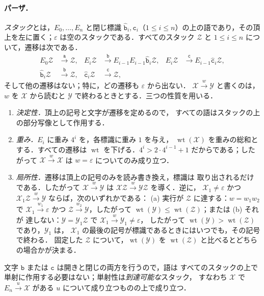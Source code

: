 \documentclass[11pt,a4paper]{ltjsarticle}
\numberwithin{equation}{section}
\theoremstyle{plain}
\theoremstyle{definition}
\theoremstyle{remark}
\newcommand{\eps}{\varepsilon}
\theoremstyle{plain}
\begin{document}
\paragraph{パーザ．}
\emph{スタック}とは，$E_0,\ldots,E_n$ と閉じ標識
$\hat{\mathtt b}_i,\hat{\mathtt c}_i$（$1\le i\le n$）の上の語であり，その頂上を左に置く；$\eps$
は空のスタックである．すべてのスタック $\mathcal Z$ と $1\le i\le n$ について，遷移は次である．
\[
\begin{aligned}
E_0\mathcal Z&\xrightarrow{\mathtt a}\mathcal Z,&
E_i\mathcal Z&\xrightarrow{\mathtt b}E_{i-1}E_{i-1}\hat{\mathtt b}_i\mathcal Z,&
E_i\mathcal Z&\xrightarrow{\mathtt c}E_{i-1}\hat{\mathtt c}_i\mathcal Z,\\
\hat{\mathtt b}_i\mathcal Z&\xrightarrow{\mathtt b}\mathcal Z,&
\hat{\mathtt c}_i\mathcal Z&\xrightarrow{\mathtt c}\mathcal Z,
\end{aligned}
\]
そして他の遷移はない；特に，どの遷移も $\eps$ から出ない．
$\mathcal X\xrightarrow{w}\mathcal Y$ と書くのは，$w$ を $\mathcal X$ から読むと
$\mathcal Y$ で終わるときとする．三つの性質を用いる．
\begin{enumerate}[label=\textup{(D\arabic*)},leftmargin=2.6em]
\item \emph{決定性．}頂上の記号と文字が遷移を定めるので，
すべての語はスタックの上の部分写像として作用する．
\item \emph{重み．}$E_i$ に重み $4^i$ を，各標識に重み $1$ を与え，
$\operatorname{wt}(\mathcal X)$ を重みの総和とする．すべての遷移は
$\operatorname{wt}$ を下げる．$4^i>2\cdot4^{i-1}+1$ だからである；したがって
$\mathcal X\xrightarrow{w}\mathcal X$ は $w=\eps$ についてのみ成り立つ．
\item \emph{局所性．}遷移は頂上の記号のみを読み書き換え，標識は
取り出されるだけである．したがって $\mathcal X\xrightarrow{w}\mathcal Y$ は
$\mathcal X\mathcal Z\xrightarrow{w}\mathcal Y\mathcal Z$ を導く．逆に，
$\mathcal X_1\ne\eps$ かつ $\mathcal X_1\mathcal Z\xrightarrow{w}\mathcal Y$ ならば，次のいずれかである：
\textup{(a)} 実行が $\mathcal Z$ に達する：$w=w_1w_2$ で
$\mathcal X_1\xrightarrow{w_1}\eps$ かつ $\mathcal Z\xrightarrow{w_2}\mathcal Y$，したがって
$\operatorname{wt}(\mathcal Y)\le\operatorname{wt}(\mathcal Z)$；または \textup{(b)} それが
達しない：$\mathcal Y=\mathcal Y_1\mathcal Z$ で $\mathcal X_1\xrightarrow{w}\mathcal Y_1\ne\eps$，
したがって $\operatorname{wt}(\mathcal Y)>\operatorname{wt}(\mathcal Z)$ であり，$\mathcal Y_1$ は，
$\mathcal X_1$ の最後の記号が標識であるときにはいつでも，その記号で終わる．
固定した $\mathcal Z$ について，$\operatorname{wt}(\mathcal Y)$ を
$\operatorname{wt}(\mathcal Z)$ と比べるとどちらの場合かが決まる．
\end{enumerate}
文字 $\mathtt b$ または $\mathtt c$ は開きと閉じの両方を行うので，語は
すべてのスタックの上で単射に作用する必要はない；単射性は\emph{到達可能な}スタック，
すなわち $\mathcal X$ で $E_n\xrightarrow{u}\mathcal X$ がある $u$ について成り立つものの上で成り立つ．
\end{document}
